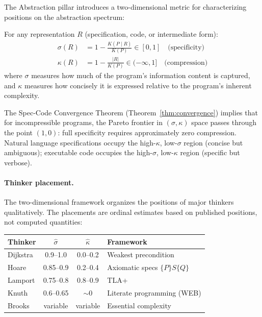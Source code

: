 The Abstraction pillar introduces a two-dimensional metric for characterizing positions on the abstraction spectrum:

\begin{definition}
\label{def:sigma-kappa}
For any representation $R$ (specification, code, or intermediate form):
\begin{align}
    \sigma(R) &= 1 - \frac{K(P \mid R)}{K(P)} \in [0, 1] \quad \text{(specificity)} \\
    \kappa(R) &= 1 - \frac{|R|}{K(P)} \in (-\infty, 1] \quad \text{(compression)}
\end{align}
where $\sigma$ measures how much of the program's information content is captured, and $\kappa$ measures how concisely it is expressed relative to the program's inherent complexity.
\end{definition}

The Spec-Code Convergence Theorem (Theorem~\ref{thm:convergence}) implies that for incompressible programs, the Pareto frontier in $(\sigma, \kappa)$ space passes through the point $(1, 0)$: full specificity requires approximately zero compression. Natural language specifications occupy the high-$\kappa$, low-$\sigma$ region (concise but ambiguous); executable code occupies the high-$\sigma$, low-$\kappa$ region (specific but verbose).

\paragraph{Thinker placement.} The two-dimensional framework organizes the positions of major thinkers qualitatively. The placements are ordinal estimates based on published positions, not computed quantities:

\begin{center}
\small
\begin{tabular}{lccl}
\toprule
\textbf{Thinker} & $\hat{\sigma}$ & $\hat{\kappa}$ & \textbf{Framework} \\
\midrule
Dijkstra & 0.9--1.0 & 0.0--0.2 & Weakest precondition \\
Hoare & 0.85--0.9 & 0.2--0.4 & Axiomatic specs $\{P\}S\{Q\}$ \\
Lamport & 0.75--0.8 & 0.8--0.9 & TLA+ \\
Knuth & 0.6--0.65 & $\sim$0 & Literate programming (WEB) \\
Brooks & variable & variable & Essential complexity \\
\bottomrule
\end{tabular}
\end{center}

